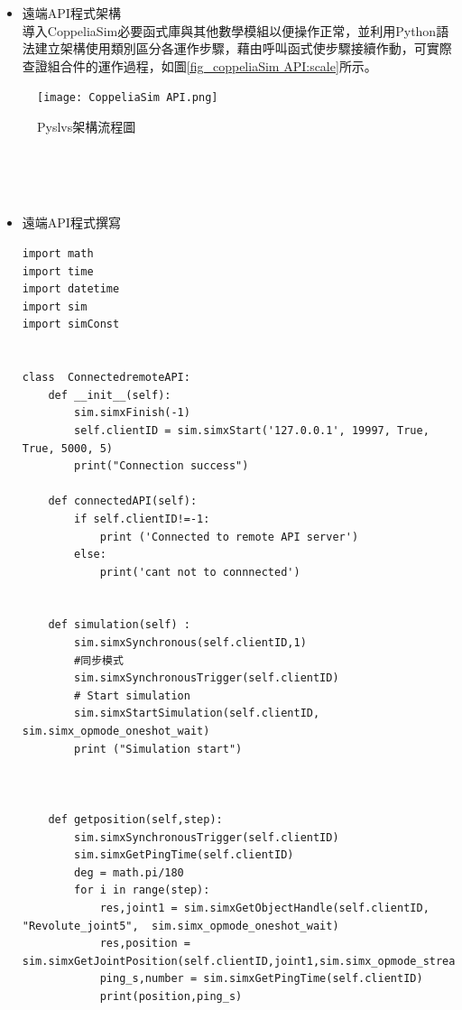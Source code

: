 \documentclass[14pt,a4paper]{report}  %
\begin{document}
{{{{      \begin{itemize}
     \item 遠端API程式架構
     \hspace*{\fill} \\
     導入CoppeliaSim必要函式庫與其他數學模組以便操作正常，並利用Python語法建立架構使用類別區分各運作步驟，藉由呼叫函式使步驟接續作動，可實際查證組合件的運作過程，如圖\ref{fig_coppeliaSim API:scale}所示。
     \end{itemize}
     
     \begin{figure}[hbt!]
        \centering
        \texttt{[image: CoppeliaSim API.png]} 
        \caption{Pyslvs架構流程圖}
        \label{fig_coppeliasim API:scale}
        \end{figure}
        
     
     \hspace*{\fill} \\
     \hspace*{\fill} \\
     \hspace*{\fill} \\
     \begin{itemize}
     \item 遠端API程式撰寫
     \hspace*{\fill} \\
		\begin{lstlisting}[caption=遠端API程式架構]
import math 
import time
import datetime
import sim 
import simConst


class  ConnectedremoteAPI:
    def __init__(self):
        sim.simxFinish(-1)
        self.clientID = sim.simxStart('127.0.0.1', 19997, True, True, 5000, 5)
        print("Connection success")
          
    def connectedAPI(self):
        if self.clientID!=-1:
            print ('Connected to remote API server')
        else:
            print('cant not to connnected')
            
        
    def simulation(self) :
        sim.simxSynchronous(self.clientID,1)
        #同步模式
        sim.simxSynchronousTrigger(self.clientID)
        # Start simulation
        sim.simxStartSimulation(self.clientID, sim.simx_opmode_oneshot_wait)
        print ("Simulation start")

        
    
    def getposition(self,step):
        sim.simxSynchronousTrigger(self.clientID)
        sim.simxGetPingTime(self.clientID)
        deg = math.pi/180
        for i in range(step):
            res,joint1 = sim.simxGetObjectHandle(self.clientID, "Revolute_joint5",  sim.simx_opmode_oneshot_wait)
            res,position = sim.simxGetJointPosition(self.clientID,joint1,sim.simx_opmode_streaming)
            ping_s,number = sim.simxGetPingTime(self.clientID)
            print(position,ping_s)
   

\end{lstlisting}
\end{itemize}}}}}
\end{document}
